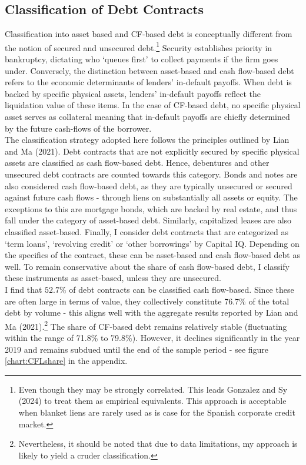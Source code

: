 \documentclass[12pt]{article}
\begin{document}
\subsection{Classification of Debt Contracts \label{sec:classification}}
Classification into asset based and CF-based debt is conceptually different from the notion of secured and unsecured debt.\footnote{Even though they may be strongly correlated. This leads Gonzalez and Sy (2024) to treat them as empirical equivalents. This approach is acceptable when blanket liens are rarely used  as is case for the Spanish corporate credit market.} Security establishes priority in bankruptcy, dictating who `queues first' to collect payments if the firm goes under. Conversely, the distinction between asset-based and cash flow-based debt refers to the economic determinants of lenders' in-default payoffs. When debt is backed by specific physical assets, lenders' in-default payoffs reflect the liquidation value of these items. In the case of CF-based debt, no specific physical asset serves as collateral meaning that in-default payoffs are chiefly determined by the future cash-flows of the borrower. \vspace{3mm} \\
The classification strategy adopted here follows the principles outlined by Lian and Ma (2021). Debt contracts that are not explicitly secured by specific physical assets are classified as cash flow-based debt. Hence, debentures and other unsecured debt contracts are counted towards this category. Bonds and notes are also considered cash flow-based debt, as they are typically unsecured or secured against future cash flows - through liens on substantially all assets or equity. The exceptions to this are mortgage bonds, which are backed by real estate, and thus fall under the category of asset-based debt. Similarly, capitalized leases are also classified asset-based. Finally, I consider debt contracts that are categorized as `term loans', `revolving credit' or `other borrowings' by Capital IQ. Depending on the specifics of the contract, these can be asset-based and cash flow-based debt as well. To remain conservative about the share of cash flow-based debt, I classify these instruments as asset-based, unless they are unsecured.  \vspace{3mm} \\
I find that $52.7\%$ of debt contracts can be classified cash flow-based. Since these are often large in terms of value, they collectively constitute 76.7\% of the total debt by volume - this aligns well with the aggregate results reported by Lian and Ma (2021).\footnote{Nevertheless, it should be noted that due to data limitations, my approach is likely to yield a cruder classification.} The share of CF-based debt remains relatively stable (fluctuating within the range of 71.8\% to 79.8\%). However, it declines significantly in the year 2019 and remains subdued until the end of the sample period - see figure \ref{chart:CFLshare} in the appendix. 
\end{document}
